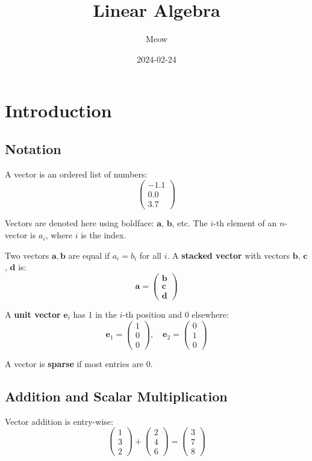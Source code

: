 \documentclass{book}
\title{\textbf{Linear Algebra}}
\author{Meow}
\date{2024-02-24}
\begin{document}
\maketitle
\thispagestyle{empty}

\chapter{Introduction}
\section{Notation}
A vector is an ordered list of numbers:
\[
    \begin{pmatrix}
        -1.1 \\ 0.0 \\ 3.7
    \end{pmatrix}
\]

Vectors are denoted here using boldface: $\bm{a}$, $\bm{b}$, etc. The $i$-th element of an $n$-vector is $a_i$, where $i$ is the index.

Two vectors $\bm{a}, \bm{b}$ are equal if $a_i = b_i$ for all $i$. A \textbf{stacked vector} with vectors $\bm{b}$, $\bm{c}$, $\bm{d}$ is:
\[
    \bm{a} = \begin{pmatrix}
        \bm{b} \\ \bm{c} \\ \bm{d}
    \end{pmatrix}
\]

A \textbf{unit vector} $\bm{e}_i$ has 1 in the $i$-th position and 0 elsewhere:
\[
    \bm{e}_1 = \begin{pmatrix}
        1 \\ 0 \\ 0
    \end{pmatrix}, \quad
    \bm{e}_2 = \begin{pmatrix}
        0 \\ 1 \\ 0
    \end{pmatrix}
\]

A vector is \textbf{sparse} if most entries are 0.

\section{Addition and Scalar Multiplication}
Vector addition is entry-wise:
\[
    \begin{pmatrix} 1 \\ 3 \\ 2 \end{pmatrix} +
    \begin{pmatrix} 2 \\ 4 \\ 6 \end{pmatrix} =
    \begin{pmatrix} 3 \\ 7 \\ 8 \end{pmatrix}
\]
\end{document}
